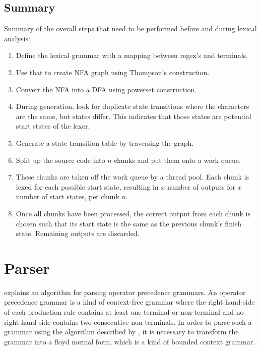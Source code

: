 \subsection{Summary}
Summary of the overall steps that need to be performed before and during lexical
analysis:

\begin{enumerate}
	\item Define the lexical grammar with a mapping between regex's and terminals.
	\item Use that to create NFA graph using Thompson's construction.
	\item Convert the NFA into a DFA using powerset construction.
	\item During generation, look for duplicate state transitions where the
		  characters are the same, but states differ. This indicates that those
		  states are potential start states of the lexer.
	\item Generate a state transition table by traversing the graph.
	\item Split up the source code into $n$ chunks and put them onto a work queue.
	\item These chunks are taken off the work queue by a thread pool. Each chunk
		  is lexed for each possible start state, resulting in $x$ number of outputs for $x$
		  number of start states, per chunk $n$.
	\item Once all chunks have been processed, the correct output from each chunk is
		  chosen such that its start state is the same as the previous chunk's finish
    	  state. Remaining outputs are discarded.
\end{enumerate}

\section{Parser} \label{design_parser}

\cite{barenghi_parallel_2015} explains an algorithm for parsing operator
precedence grammars. An operator precedence grammar is a kind of context-free
grammar where the right hand-side of each production rule contains at least
one terminal or non-terminal and no right-hand side contains two consecutive
non-terminals. In order to parse such a grammar using the algorithm described by
\cite{barenghi_parallel_2015}, it is necessary to transform the grammar into a
floyd normal form, which is a kind of bounded context grammar.



